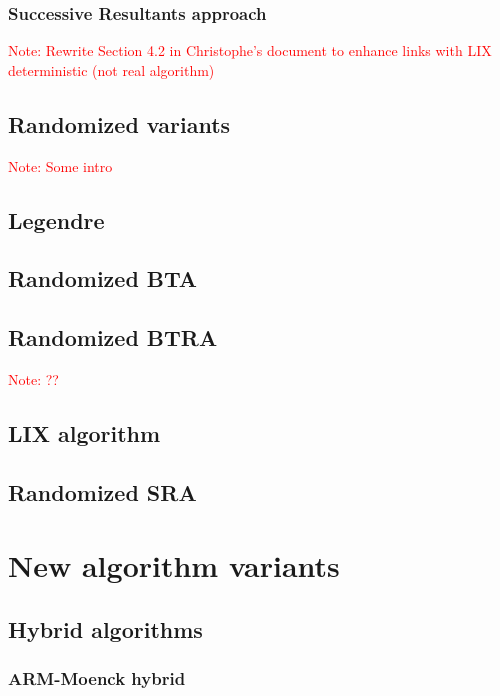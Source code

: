 \documentclass{article}
\newcounter{algo}
\newcommand{\Notes}[1]{\textcolor{red}{Note: #1}}
\begin{document}
\subsubsection{Successive Resultants approach}
\label{sec:LIX}
\Notes{Rewrite Section 4.2 in Christophe's document to enhance links with LIX deterministic (not real algorithm)}



\subsection{Randomized variants}
\label{sec:randomized-variants}

\Notes{Some intro}

\subsection{Legendre}
\label{sec:legendre}

\subsection{Randomized BTA}
\label{sec:BTArand}

\subsection{Randomized BTRA}
\label{sec:BTRArand}
\Notes{??}

\subsection{LIX algorithm}
\label{sec:LIXrand}

\subsection{Randomized SRA}
\label{sec:SRArand}




\section{New algorithm variants}
\label{sec:new-variants}

\subsection{Hybrid algorithms}
\label{sec:hybrid-algorithms}

\subsubsection{ARM-Moenck hybrid}
\end{document}
